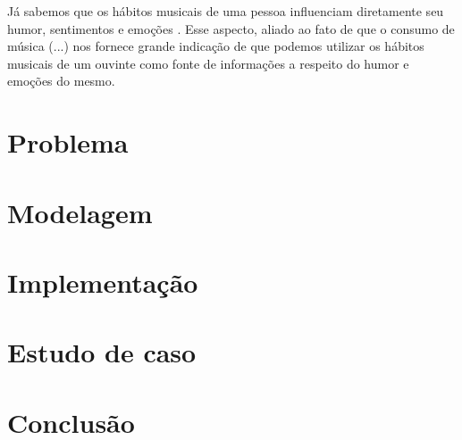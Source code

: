 Já sabemos que os hábitos musicais de uma pessoa influenciam diretamente
seu humor, sentimentos e emoções \cite{mccraty1998}. Esse aspecto, aliado ao fato de que o consumo de música (...) nos fornece grande indicação de que podemos
utilizar os hábitos musicais de um ouvinte como fonte de informações a
respeito do humor e emoções do mesmo.

\section{Problema}

\section{Modelagem}

\section{Implementação}

\section{Estudo de caso}

\section{Conclusão}